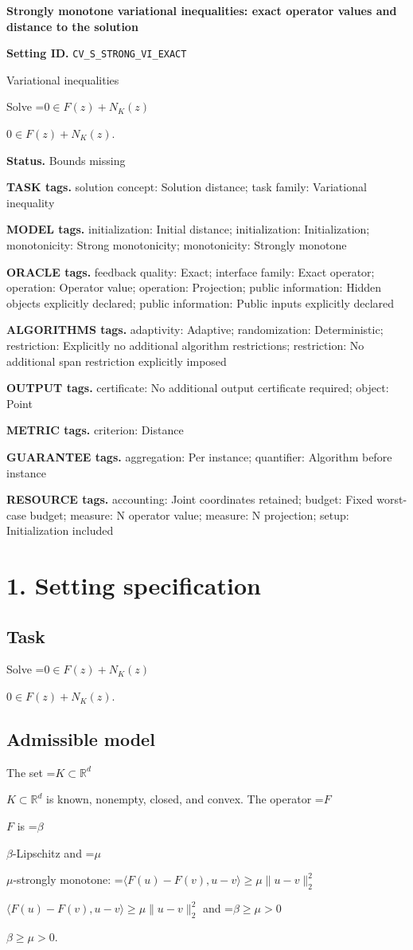 \documentclass[10pt,a4paper]{article}
\newcommand{\AtlasMath}[1]{\par\begingroup\centering\setbox0=\hbox{$\displaystyle #1$}\ifdim\wd0>1.4\linewidth\typeout{ATLAS WIDE FORMULA: \the\wd0}\fi\ifdim\wd0>\linewidth\resizebox{\linewidth}{!}{\box0}\else\box0\fi\par\endgroup}
\newcommand{\AtlasInlineMath}[1]{\begingroup\setbox0=\hbox{$#1$}\ifdim\wd0>.4\linewidth\endgroup\AtlasMath{#1}\else\endgroup$#1$\fi}
\begin{document}
\raggedright

{\LARGE\bfseries\sffamily\color{AtlasNavy} Strongly monotone variational inequalities: exact operator values and distance to the solution\par}\vspace{5pt}
\textbf{Setting ID.} \texttt{CV\_\allowbreak{}S\_\allowbreak{}STRONG\_\allowbreak{}VI\_\allowbreak{}EXACT}

Variational inequalities

Solve \AtlasInlineMath{0\in F(z)+N_K(z)}.

\textbf{Status.} Bounds missing

\textbf{TASK tags.} solution concept: Solution distance; task family: Variational inequality

\textbf{MODEL tags.} initialization: Initial distance; initialization: Initialization; monotonicity: Strong monotonicity; monotonicity: Strongly monotone

\textbf{ORACLE tags.} feedback quality: Exact; interface family: Exact operator; operation: Operator value; operation: Projection; public information: Hidden objects explicitly declared; public information: Public inputs explicitly declared

\textbf{ALGORITHMS tags.} adaptivity: Adaptive; randomization: Deterministic; restriction: Explicitly no additional algorithm restrictions; restriction: No additional span restriction explicitly imposed

\textbf{OUTPUT tags.} certificate: No additional output certificate required; object: Point

\textbf{METRIC tags.} criterion: Distance

\textbf{GUARANTEE tags.} aggregation: Per instance; quantifier: Algorithm before instance

\textbf{RESOURCE tags.} accounting: Joint coordinates retained; budget: Fixed worst-case budget; measure: N operator value; measure: N projection; setup: Initialization included

\section{1. Setting specification}
\subsection{Task}
Solve \AtlasInlineMath{0\in F(z)+N_K(z)}.

\subsection{Admissible model}
The set \AtlasInlineMath{K\subset\mathbb{R}^d} is known, nonempty, closed, and convex. The operator \AtlasInlineMath{F} is \AtlasInlineMath{\beta}-Lipschitz and \AtlasInlineMath{\mu}-strongly monotone: \AtlasInlineMath{\langle F(u)-F(v),u-v\rangle\ge\mu\|u-v\|_2^2} and \AtlasInlineMath{\beta\ge\mu>0}.
\end{document}
